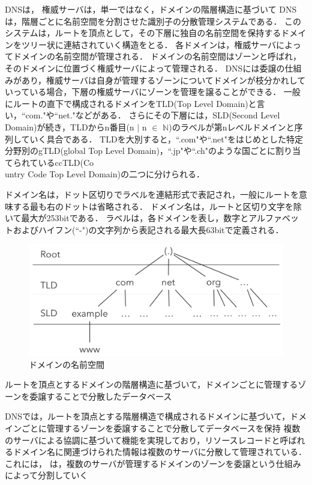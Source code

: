 DNSは，
権威サーバは，単一ではなく，ドメインの階層構造に基づいて
DNSは，階層ごとに名前空間を分割させた識別子の分散管理システムである．
このシステムは，ルートを頂点として，その下層に独自の名前空間を保持するドメインをツリー状に連結されていく構造をとる．
各ドメインは，権威サーバによってドメインの名前空間が管理される．
ドメインの名前空間はゾーンと呼ばれ，そのドメインに位置づく権威サーバによって管理される．
DNSには委譲の仕組みがあり，権威サーバは自身が管理するゾーンについてドメインが枝分かれしていっている場合，下層の権威サーバにゾーンを管理を譲ることができる．
一般にルートの直下で構成されるドメインをTLD(Top Level Domain)と言い，``com."や``net."などがある．
さらにその下層には，SLD(Second Level Domain)が続き，TLDからn番目(n $\mid$ n $\in$ $\mathbb{N}$)のラベルが第nレベルドメインと序列していく具合である．
TLDを大別すると，``.com"や``.net"をはじめとした特定分野別のgTLD(global Top Level Domain)，``.jp"や``.ch"のような国ごとに割り当てられているccTLD(Co\\untry Code Top Level Domain)の二つに分けられる．

ドメイン名は，ドット区切りでラベルを連結形式で表記され，一般にルートを意味する最も右のドットは省略される．
ドメイン名は，ルートと区切り文字を除いて最大が253bitである．
ラベルは，各ドメインを表し，数字とアルファベットおよびハイフン(``-")の文字列から表記される最大長63bitで定義される．

\begin{figure}[h]
 \centering
 \includegraphics[width=12.0cm]{figure/dns-architecture.png}
 \caption{ドメインの名前空間}
 \label{fig:dns-architecture}
\end{figure}

ルートを頂点とするドメインの階層構造に基づいて，ドメインごとに管理するゾーンを委譲することで分散したデータベース

DNSでは，ルートを頂点とする階層構造で構成されるドメインに基づいて，ドメインごとに管理するゾーンを委譲することで分散してデータベースを保持
複数のサーバによる協調に基づいて機能を実現しており，リソースレコードと呼ばれるドメイン名に関連づけられた情報は複数のサーバに分散して管理されている．
これには，
は，複数のサーバが管理するドメインのゾーンを委譲という仕組みによって分割していく


